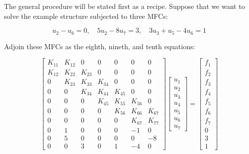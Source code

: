 \documentclass[10pt,b5paper,titlepage]{book}
\begin{document}
The general procedure will be stated first as a recipe. Suppose that we want
to solve the example structure subjected to three MFCs:

\begin{equation}
    u_2 - u_6 = 0, \quad 5 u_2 - 8 u_7 = 3, \quad 3 u_3 + u_5 - 4 u_6 = 1
\end{equation}

Adjoin these MFCs as the eighth, nineth, and tenth equations:

\begin{equation}
    \begin{bmatrix}
        K_{11} & K_{12} & 0 & 0 & 0 & 0 & 0 \\
        K_{12} & K_{22} & K_{23} & 0 & 0 & 0 & 0 \\
        0 & K_{23} & K_{33} & K_{34} & 0 & 0 & 0 \\
        0 & 0 & K_{34} & K_{44} & K_{45} & 0 & 0 \\
        0 & 0 & 0 & K_{45} & K_{55} & K_{56} & 0 \\
        0 & 0 & 0 & 0 & K_{56} & K_{66} & K_{67} \\
        0 & 0 & 0 & 0 & 0 & K_{67} & K_{77} \\
        0 & 1 & 0 & 0 & 0 & -1 & 0 \\
        0 & 5 & 0 & 0 & 0 & 0 & -8 \\
        0 & 0 & 3 & 0 & 1 & -4 & 0
    \end{bmatrix}
    \begin{bmatrix}
        u_1 \\
        u_2 \\
        u_3 \\
        u_4 \\
        u_5 \\
        u_6 \\
        u_7
    \end{bmatrix}
    = \begin{bmatrix}
        f_1 \\
        f_2 \\
        f_3 \\
        f_4 \\
        f_5 \\
        f_6 \\
        f_7 \\
        0 \\
        3 \\
        1
    \end{bmatrix}
\end{equation}
\end{document}
